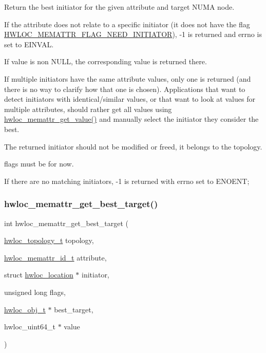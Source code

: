 Return the best initiator for the given attribute and target N\+U\+MA node. 

If the attribute does not relate to a specific initiator (it does not have the flag \hyperlink{a00212_gga78aceb4cac4d614c0f5e82dbfeb779e5a9d16523e285b2e22cfc78cc84dce8c96}{H\+W\+L\+O\+C\+\_\+\+M\+E\+M\+A\+T\+T\+R\+\_\+\+F\+L\+A\+G\+\_\+\+N\+E\+E\+D\+\_\+\+I\+N\+I\+T\+I\+A\+T\+OR}), {\ttfamily -\/1} is returned and {\ttfamily errno} is set to {\ttfamily E\+I\+N\+V\+AL}.

If {\ttfamily value} is non {\ttfamily N\+U\+LL}, the corresponding value is returned there.

If multiple initiators have the same attribute values, only one is returned (and there is no way to clarify how that one is chosen). Applications that want to detect initiators with identical/similar values, or that want to look at values for multiple attributes, should rather get all values using \hyperlink{a00211_ga297e4a9adc2272446a4c7449dacef0df}{hwloc\+\_\+memattr\+\_\+get\+\_\+value()} and manually select the initiator they consider the best.

The returned initiator should not be modified or freed, it belongs to the topology.

{\ttfamily flags} must be {} for now.

If there are no matching initiators, {\ttfamily -\/1} is returned with {\ttfamily errno} set to {\ttfamily E\+N\+O\+E\+NT}; \mbox{\label{a00211_ga884d1f2ad745c2fa69c1583c82d28f10}} 
\subsubsection{\texorpdfstring{hwloc\+\_\+memattr\+\_\+get\+\_\+best\+\_\+target()}{hwloc\_memattr\_get\_best\_target()}}
{\footnotesize\ttfamily int hwloc\+\_\+memattr\+\_\+get\+\_\+best\+\_\+target (\begin{DoxyParamCaption}\item[{\hyperlink{a00186_ga9d1e76ee15a7dee158b786c30b6a6e38}{hwloc\+\_\+topology\+\_\+t}}]{topology,  }\item[{\hyperlink{a00211_gacc82003a8610be554615995f0996c888}{hwloc\+\_\+memattr\+\_\+id\+\_\+t}}]{attribute,  }\item[{struct \hyperlink{a00314}{hwloc\+\_\+location} $\ast$}]{initiator,  }\item[{unsigned long}]{flags,  }\item[{\hyperlink{a00185_ga79b8ab56877ef99ac59b833203391c7d}{hwloc\+\_\+obj\+\_\+t} $\ast$}]{best\+\_\+target,  }\item[{hwloc\+\_\+uint64\+\_\+t $\ast$}]{value }\end{DoxyParamCaption})}



